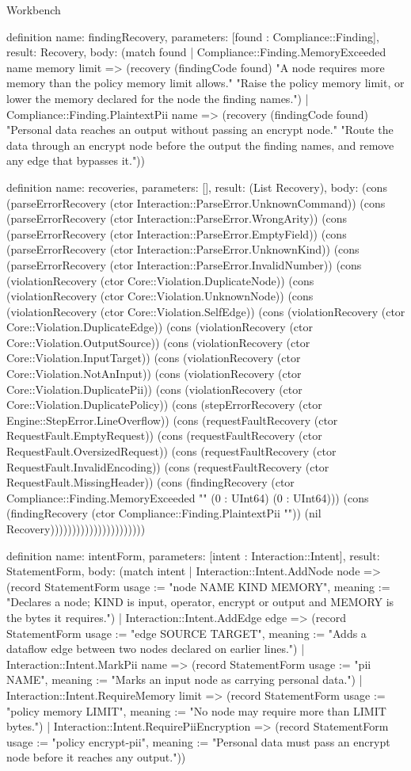 \begin{lexlean}{Workbench}
\begin{semanticmodule}
definition{
  name: findingRecovery,
  parameters: [found : Compliance::Finding],
  result: Recovery,
  body: (match found
    | Compliance::Finding.MemoryExceeded name memory limit => (recovery (findingCode found) "A node requires more memory than the policy memory limit allows." "Raise the policy memory limit, or lower the memory declared for the node the finding names.")
    | Compliance::Finding.PlaintextPii name => (recovery (findingCode found) "Personal data reaches an output without passing an encrypt node." "Route the data through an encrypt node before the output the finding names, and remove any edge that bypasses it."))
}

definition{
  name: recoveries,
  parameters: [],
  result: (List Recovery),
  body: (cons (parseErrorRecovery (ctor Interaction::ParseError.UnknownCommand)) (cons (parseErrorRecovery (ctor Interaction::ParseError.WrongArity)) (cons (parseErrorRecovery (ctor Interaction::ParseError.EmptyField)) (cons (parseErrorRecovery (ctor Interaction::ParseError.UnknownKind)) (cons (parseErrorRecovery (ctor Interaction::ParseError.InvalidNumber)) (cons (violationRecovery (ctor Core::Violation.DuplicateNode)) (cons (violationRecovery (ctor Core::Violation.UnknownNode)) (cons (violationRecovery (ctor Core::Violation.SelfEdge)) (cons (violationRecovery (ctor Core::Violation.DuplicateEdge)) (cons (violationRecovery (ctor Core::Violation.OutputSource)) (cons (violationRecovery (ctor Core::Violation.InputTarget)) (cons (violationRecovery (ctor Core::Violation.NotAnInput)) (cons (violationRecovery (ctor Core::Violation.DuplicatePii)) (cons (violationRecovery (ctor Core::Violation.DuplicatePolicy)) (cons (stepErrorRecovery (ctor Engine::StepError.LineOverflow)) (cons (requestFaultRecovery (ctor RequestFault.EmptyRequest)) (cons (requestFaultRecovery (ctor RequestFault.OversizedRequest)) (cons (requestFaultRecovery (ctor RequestFault.InvalidEncoding)) (cons (requestFaultRecovery (ctor RequestFault.MissingHeader)) (cons (findingRecovery (ctor Compliance::Finding.MemoryExceeded "" (0 : UInt64) (0 : UInt64))) (cons (findingRecovery (ctor Compliance::Finding.PlaintextPii "")) (nil Recovery))))))))))))))))))))))
}

definition{
  name: intentForm,
  parameters: [intent : Interaction::Intent],
  result: StatementForm,
  body: (match intent
    | Interaction::Intent.AddNode node => (record StatementForm {usage := "node NAME KIND MEMORY", meaning := "Declares a node; KIND is input, operator, encrypt or output and MEMORY is the bytes it requires."})
    | Interaction::Intent.AddEdge edge => (record StatementForm {usage := "edge SOURCE TARGET", meaning := "Adds a dataflow edge between two nodes declared on earlier lines."})
    | Interaction::Intent.MarkPii name => (record StatementForm {usage := "pii NAME", meaning := "Marks an input node as carrying personal data."})
    | Interaction::Intent.RequireMemory limit => (record StatementForm {usage := "policy memory LIMIT", meaning := "No node may require more than LIMIT bytes."})
    | Interaction::Intent.RequirePiiEncryption => (record StatementForm {usage := "policy encrypt-pii", meaning := "Personal data must pass an encrypt node before it reaches any output."}))
}


\end{semanticmodule}
\end{lexlean}
